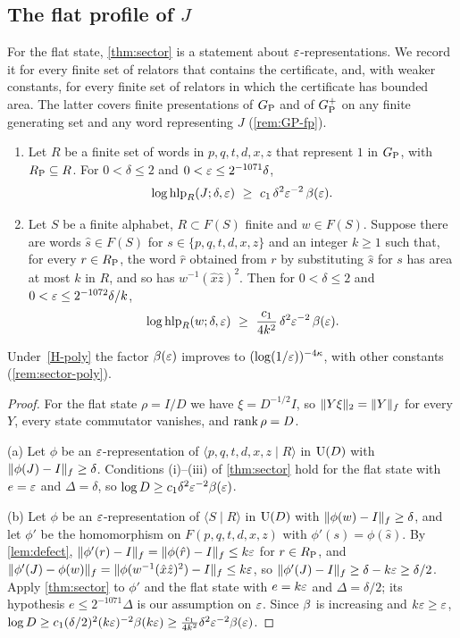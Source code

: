 \subsection{The flat profile of \texorpdfstring{$J$}{J}}

For the flat state, \cref{thm:sector} is a statement about $\varepsilon$-representations. We record it for every finite set of relators that
contains the certificate, and, with weaker constants, for every finite set of relators in which the certificate has bounded area. The
latter covers finite presentations of $G_{\mathrm P}$ and of $G_{\mathrm P}^{+}$ on any finite generating set and any word representing $J$ (\cref{rem:GP-fp}).

\begin{corollary}\label{cor:hlp-lower}
\leavevmode
\begin{enumerate}[label=(\alph*),itemsep=1pt]
\item Let $R$ be a finite set of words in $p,q,t,d,x,z$ that represent $1$ in $G_{\mathrm P}$, with $R_{\mathrm P}\subseteq R$. For $0<\delta\le2$ and
$0<\varepsilon\le2^{-1071}\delta$,
\[
\log\hlp_R(J;\delta,\eps)\ \ge\ c_1\,\delta^2\eps^{-2}\,\bfun(\eps).
\]
\item Let $S$ be a finite alphabet, $R\subset F(S)$ finite and $w\in F(S)$. Suppose there are words $\hat s\in F(S)$ for
$s\in\{p,q,t,d,x,z\}$ and an integer $k\ge1$ such that, for every $r\in R_{\mathrm P}$, the word $\hat r$ obtained from $r$ by substituting $\hat s$
for $s$ has area at most $k$ in $R$, and so has $w^{-1}(\hat x\hat z)^2$. Then for $0<\delta\le2$ and $0<\varepsilon\le2^{-1072}\delta/k$,
\[
\log\hlp_R(w;\delta,\eps)\ \ge\ \frac{c_1}{4k^2}\,\delta^2\eps^{-2}\,\bfun(\eps).
\]
\end{enumerate}
Under~\ref{H-poly} the factor $\beta(\varepsilon)$ improves to $(\log(1/\varepsilon))^{-4\kappa}$, with other constants (\cref{rem:sector-poly}).
\end{corollary}

\begin{proof}
For the flat state $\rho=I/D$ we have $\xi=D^{-1/2}I$, so $\lVert Y\xi\rVert_2=\lVert Y\rVert_f$ for every $Y$, every state commutator vanishes, and
$\operatorname{rank}\rho=D$.

(a) Let $\phi$ be an $\varepsilon$-representation of $\langle p,q,t,d,x,z\mid R\rangle$ in $\mathrm U(D)$ with $\lVert \phi(J)-I\rVert_f\ge\delta$. Conditions
(i)--(iii) of \cref{thm:sector} hold for the flat state with $e=\varepsilon$ and $\Delta=\delta$, so $\log D\ge c_1\delta^2\varepsilon^{-2}\beta(\varepsilon)$.

(b) Let $\phi$ be an $\varepsilon$-representation of $\langle S\mid R\rangle$ in $\mathrm U(D)$ with $\lVert \phi(w)-I\rVert_f\ge\delta$, and let $\phi'$ be the
homomorphism on $F(p,q,t,d,x,z)$ with $\phi'(s)=\phi(\hat s)$. By \cref{lem:defect}, $\lVert \phi'(r)-I\rVert_f=\lVert \phi(\hat r)-I\rVert_f\le k\varepsilon$ for
$r\in R_{\mathrm P}$, and $\lVert \phi'(J)-\phi(w)\rVert_f=\lVert \phi(w^{-1}(\hat x\hat z)^2)-I\rVert_f\le k\varepsilon$, so $\lVert \phi'(J)-I\rVert_f\ge\delta-k\varepsilon\ge\delta/2$. Apply
\cref{thm:sector} to $\phi'$ and the flat state with $e=k\varepsilon$ and $\Delta=\delta/2$; its hypothesis $e\le2^{-1071}\Delta$ is our
assumption on $\varepsilon$. Since $\beta$ is increasing and $k\varepsilon\ge\varepsilon$,
$\log D\ge c_1(\delta/2)^2(k\varepsilon)^{-2}\beta(k\varepsilon)\ge\frac{c_1}{4k^2}\delta^2\varepsilon^{-2}\beta(\varepsilon)$.
\end{proof}

